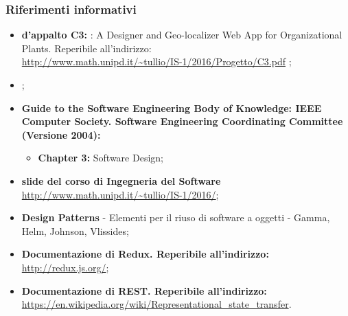	\subsubsection{Riferimenti informativi}
	\begin{itemize}
		\item \textbf{ d'appalto C3:} \progetto: A Designer and Geo-localizer Web App for Organizational Plants. Reperibile all'indirizzo:\\ \url{http://www.math.unipd.it/~tullio/IS-1/2016/Progetto/C3.pdf} ;
		\item \adrv;
		\item \textbf{Guide to the Software Engineering Body of Knowledge: IEEE Computer Society. Software Engineering Coordinating Committee (Versione 2004):}
		\begin{itemize}
			\item \textbf{Chapter 3:} Software Design;
		\end{itemize}
		\item \textbf{slide del corso di Ingegneria del Software}\\
		\url{http://www.math.unipd.it/~tullio/IS-1/2016/};
		\item \textbf{Design Patterns} - Elementi per il riuso di software a oggetti - Gamma, Helm, Johnson, Vlissides;
		\item \textbf{Documentazione di Redux. Reperibile all'indirizzo: \\}\url{http://redux.js.org/};
			\item \textbf{Documentazione di REST. Reperibile all'indirizzo: \\}\url{https://en.wikipedia.org/wiki/Representational_state_transfer}.
	\end{itemize}
